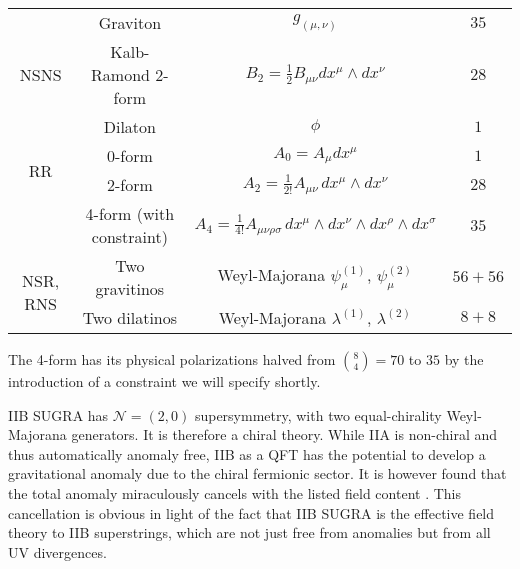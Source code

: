 \begin{center}
	\begin{tabular}{|c|c|c|c|}
		\hline
		\multirow{3}{*}{NSNS} 
	&	Graviton	& $g_{(\mu,\nu)}$ 							& $35$\\
	&	Kalb-Ramond 2-form & $B_2 = \frac{1}{2} B_{\mu\nu} dx^\mu \wedge dx^\nu$ & $28$ \\
	&	Dilaton & $\phi$ & $1$ \\
		\hline \hline
		\multirow{2}{*}{RR} 
	&	0-form		& $A_0 = A_{\mu} dx^\mu$ & $1$\\
	&	2-form		& $A_2 = \frac{1}{2!} A_{\mu\nu} \, dx^\mu \wedge dx^\nu$ & $28$\\
	&	4-form	(with constraint)	& $A_4 = \frac{1}{4!} A_{\mu\nu\rho\sigma} \, dx^\mu \wedge dx^\nu \wedge dx^\rho \wedge dx^\sigma$ & $35$\\
		\hline \hline 
		\multirow{2}{*}{NSR, RNS}
	&	Two gravitinos	& Weyl-Majorana $\psi_\mu^{(1)}$, $\psi_\mu^{(2)}$ 	& $56+56$\\
	&	Two dilatinos	& Weyl-Majorana $\lambda^{(1)}$, $\lambda^{(2)}$ 	& $8+8$\\
		\hline
	\end{tabular}
\end{center}

The 4-form has its physical polarizations halved from ${8 \choose 4} = 70$ to $35$ by the introduction of a constraint we will specify shortly.

IIB SUGRA has $\mathcal{N}=(2,0)$ supersymmetry, with two equal-chirality Weyl-Majorana generators. It is therefore a chiral theory. While IIA is non-chiral and thus automatically anomaly free, IIB as a QFT has the potential to develop a gravitational anomaly due to the chiral fermionic sector. It is however found that the total anomaly miraculously cancels with the listed field content . This cancellation is obvious in light of the fact that IIB SUGRA is the effective field theory to IIB superstrings, which are not just free from anomalies but from all UV divergences.

%
%
